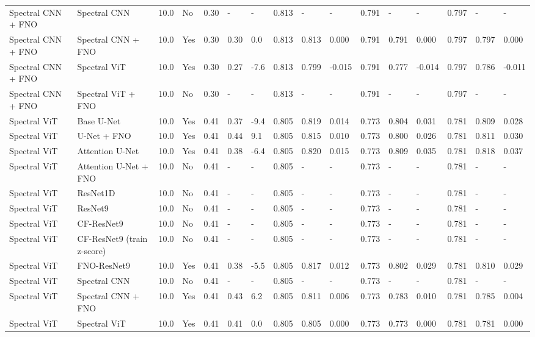 \begin{longtable}{llllllllllllllll}
Spectral CNN + FNO & Spectral CNN & 10.0 & No & 0.30 & - & - & 0.813 & - & - & 0.791 & - & - & 0.797 & - & - \\
Spectral CNN + FNO & Spectral CNN + FNO & 10.0 & Yes & 0.30 & 0.30 & 0.0 & 0.813 & 0.813 & 0.000 & 0.791 & 0.791 & 0.000 & 0.797 & 0.797 & 0.000 \\
Spectral CNN + FNO & Spectral ViT & 10.0 & Yes & 0.30 & 0.27 & -7.6 & 0.813 & 0.799 & -0.015 & 0.791 & 0.777 & -0.014 & 0.797 & 0.786 & -0.011 \\
Spectral CNN + FNO & Spectral ViT + FNO & 10.0 & No & 0.30 & - & - & 0.813 & - & - & 0.791 & - & - & 0.797 & - & - \\
Spectral ViT & Base U-Net & 10.0 & Yes & 0.41 & 0.37 & -9.4 & 0.805 & 0.819 & 0.014 & 0.773 & 0.804 & 0.031 & 0.781 & 0.809 & 0.028 \\
Spectral ViT & U-Net + FNO & 10.0 & Yes & 0.41 & 0.44 & 9.1 & 0.805 & 0.815 & 0.010 & 0.773 & 0.800 & 0.026 & 0.781 & 0.811 & 0.030 \\
Spectral ViT & Attention U-Net & 10.0 & Yes & 0.41 & 0.38 & -6.4 & 0.805 & 0.820 & 0.015 & 0.773 & 0.809 & 0.035 & 0.781 & 0.818 & 0.037 \\
Spectral ViT & Attention U-Net + FNO & 10.0 & No & 0.41 & - & - & 0.805 & - & - & 0.773 & - & - & 0.781 & - & - \\
Spectral ViT & ResNet1D & 10.0 & No & 0.41 & - & - & 0.805 & - & - & 0.773 & - & - & 0.781 & - & - \\
Spectral ViT & ResNet9 & 10.0 & No & 0.41 & - & - & 0.805 & - & - & 0.773 & - & - & 0.781 & - & - \\
Spectral ViT & CF-ResNet9 & 10.0 & No & 0.41 & - & - & 0.805 & - & - & 0.773 & - & - & 0.781 & - & - \\
Spectral ViT & CF-ResNet9 (train z-score) & 10.0 & No & 0.41 & - & - & 0.805 & - & - & 0.773 & - & - & 0.781 & - & - \\
Spectral ViT & FNO-ResNet9 & 10.0 & Yes & 0.41 & 0.38 & -5.5 & 0.805 & 0.817 & 0.012 & 0.773 & 0.802 & 0.029 & 0.781 & 0.810 & 0.029 \\
Spectral ViT & Spectral CNN & 10.0 & No & 0.41 & - & - & 0.805 & - & - & 0.773 & - & - & 0.781 & - & - \\
Spectral ViT & Spectral CNN + FNO & 10.0 & Yes & 0.41 & 0.43 & 6.2 & 0.805 & 0.811 & 0.006 & 0.773 & 0.783 & 0.010 & 0.781 & 0.785 & 0.004 \\
Spectral ViT & Spectral ViT & 10.0 & Yes & 0.41 & 0.41 & 0.0 & 0.805 & 0.805 & 0.000 & 0.773 & 0.773 & 0.000 & 0.781 & 0.781 & 0.000 \\

\end{longtable}
